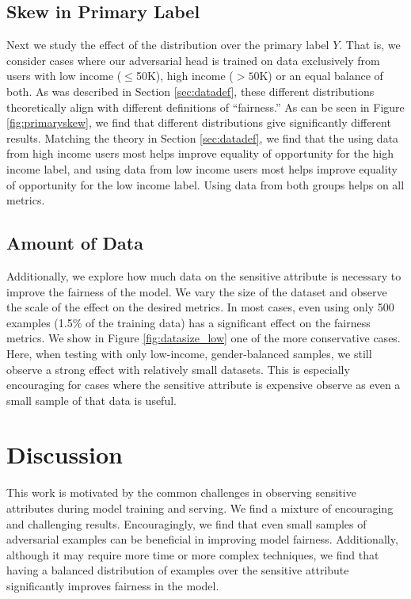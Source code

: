 \documentclass[sigconf,9pt]{acmart}
\begin{document}
\subsection{Skew in Primary Label}
Next we study the effect of the distribution over the primary label $Y$.  That is, we consider cases where our adversarial head is trained on data exclusively from users with low income ($\leq$50K), high income ($>50$K) or an equal balance of both.  As was described in Section \ref{sec:datadef}, these different distributions theoretically align with different definitions of ``fairness.''  As can be seen in Figure \ref{fig:primaryskew}, we find that different distributions give significantly different results.  Matching the theory in Section \ref{sec:datadef}, we find that the using data from high income users most helps improve equality of opportunity for the high income label, and using data from low income users most helps improve equality of opportunity for the low income label.  Using data from both groups helps on all metrics.

\subsection{Amount of Data}
Additionally, we explore how much data on the sensitive attribute is necessary to improve the fairness of the model.  We vary the size of the dataset and observe the scale of the effect on the desired metrics.  
In most cases, even using only 500 examples (1.5\% of the training data) has a significant effect on the fairness metrics. 
We show in Figure \ref{fig:datasize_low} one of the more conservative cases.
Here, when testing with only low-income, gender-balanced samples, we still observe a strong effect with relatively small datasets.  This is especially encouraging for cases where the sensitive attribute is expensive observe as even a small sample of that data is useful.

\section{Discussion}
This work is motivated by the common challenges in observing sensitive attributes during model training and serving.  We find a mixture of encouraging and challenging results.  Encouragingly, we find that even small samples of adversarial examples can be beneficial in improving model fairness.  Additionally, although it may require more time or more complex techniques, we find that having a balanced distribution of examples over the sensitive attribute significantly improves fairness in the model.  
\end{document}
